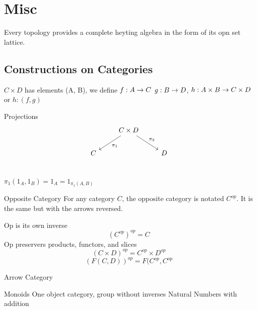 \section{Misc}

Every topology provides a complete heyting algebra in the form of its opn set lattice.

\subsection{Constructions on Categories}

$C \times D$  has elements (A, B), we define
$ f : A \rightarrow C $
$ g : B \rightarrow D $,
$ h : A \times B \rightarrow C \times D $ or $ h : (f, g) $




Projections
\[
  \begin{tikzcd}
    & C \times D \arrow[dl, "\pi_1"] \arrow[dr, "\pi_2"] &   \\
    C  &  & D \\
  \end{tikzcd}
\]

$\pi_1( 1_A, 1_B )= 1_A = 1_{\pi_1(A, B)} $

Opposite Category
For any category $C$, the opposite category is notated $C^{op}$.
It is the same but with the arrows reversed.

Op is its own inverse
$$ (C^{op})^{op} = C $$
Op preservers products, functors, and slices %
$$ (C \times D)^{op} = C^{op} \times D^{op} $$
$$ (F(C,D))^{op} = F(C^{op}, C^{op} $$

Arrow Category

\begin{definition}
  Monoids
  One object category, group without inverses
  Natural Numbers with addition
\end{definition}
